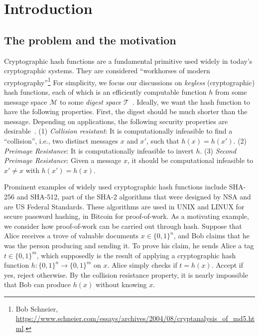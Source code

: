 \section{Introduction}
\subsection{The problem and the motivation}
Cryptographic hash functions are a fundamental primitive used widely in today's cryptographic systems. They are  considered ``workhorses of modern cryptography''\footnote{Bob Schneier, \url{https://www.schneier.com/essays/archives/2004/08/cryptanalysis_of_md5.html}.} For simplicity, we focus our discussions on {\em keyless} (cryptographic) hash functions, each of which is an efficiently computable function $h$ from some message space $\mathcal{M}$ to some {\em digest space} $\mathcal{T}$~\cite{BonehS:book,preneel1994cryptographic, rogaway2004cryptographic}. Ideally, we want the hash function to have the following properties. First, the digest should be much shorter than the message. Depending on applications, the following security properties are desirable~\cite{rogaway2004cryptographic}. (1) {\em Collision resistant}: It is computationally infeasible to find a ``collision'', i.e., two distinct messages $x$ and $x'$, such that $h(x)=h(x')$.  (2) {\em Preimage Resistance}: It is computationally infeasible to invert $h$. (3) {\em Second Preimage Resistance}: Given a message $x$, it should be computational infeasible to $x'\neq x$ with $h(x')=h(x)$.


Prominent examples of widely used cryptographic hash functions include SHA-256 and SHA-512, part of the SHA-2 algorithms that were designed by NSA and are US Federal Standards. These algorithms are used in UNIX and LINUX for secure password hashing, in Bitcoin for proof-of-work.
As a motivating example, we consider how proof-of-work can be carried out through hash. Suppose that Alice receives a trove of valuable documents $x\in\{0, 1\}^n$, and Bob claims that he was the person producing and sending it. To prove his claim, he  sends Alice a tag $t\in\{0, 1\}^m$, which supposedly is the result of applying a
cryptographic hash function $h:\{0, 1\}^n\to\{0, 1\}^m$ on $x$. Alice simply checks if $t=h(x)$. Accept if yes, reject otherwise. By the collision resistance property, it is nearly impossible that Bob can produce $h(x)$ without knowing $x$. 


